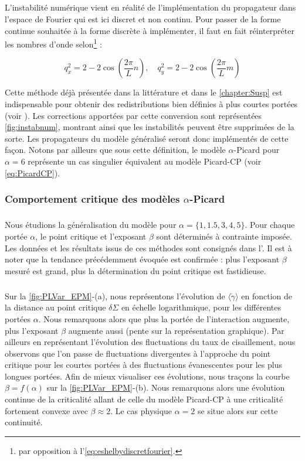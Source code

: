 \subparagraph{}L'instabilité numérique vient en réalité de l'implémentation du propagateur dans l'espace de Fourier qui est ici discret et non continu. Pour passer de la forme continue souhaitée à la forme discrète à implémenter, il faut en fait réinterpréter les nombres d'onde selon\footnote{par opposition à l'\autoref{eq:eshelbydiscretfourier}.} :

\begin{equation}
	q_x^2 = 2-2\cos\left( \frac{2\pi}{L}n \right),\quad q_y^2 = 2-2\cos\left( \frac{2\pi}{L}m \right)
\end{equation}

\noindent Cette méthode déjà présentée dans la littérature \cite{ferrero_criticality_2019, rossi_finite-disorder_2022} et dans le \autoref{chapter:Susp} est indispensable pour obtenir des redistributions bien définies à plus courtes portées (voir ). Les corrections apportées par cette conversion sont représentées \autoref{fig:instabnum}, montrant ainsi que les instabilités peuvent être supprimées de la sorte. Les propagateurs du modèle généralisé seront donc implémentés de cette façon. Notons par ailleurs que sous cette définition, le modèle $\alpha$-Picard pour $\alpha = 6$ représente un cas singulier équivalent au modèle Picard-CP (voir \autoref{eq:PicardCP}).

\subsubsection{Comportement critique des modèles $\alpha$-Picard}

\label{sec:criticalitealphapicard}

\subparagraph{}Nous étudions la généralisation du modèle pour $\alpha = \{1, 1.5, 3, 4, 5\}$. Pour chaque portée $\alpha$, le point critique et l'exposant $\beta$ sont déterminés à contrainte imposée. Les données et les résultats issus de ces méthodes sont consignés dans l'. Il est à noter que la tendance précédemment évoquée est confirmée : plus l'exposant $\beta$ mesuré est grand, plus la détermination du point critique est fastidieuse.

\subparagraph{}Sur la \autoref{fig:PLVar_EPM}-(a), nous représentons l'évolution de $\langle \dot{\gamma} \rangle$ en fonction de la distance au point critique $\delta\Sigma$ en échelle logarithmique, pour les différentes portées $\alpha$. Nous remarquons alors que plus la portée de l'interaction augmente, plus l'exposant $\beta$ augmente aussi (pente sur la représentation graphique). Par ailleurs en représentant l'évolution des fluctuations du taux de cisaillement, nous observons que l'on passe de fluctuations divergentes à l'approche du point critique pour les courtes portées à des fluctuations évanescentes pour les plus longues portées. Afin de mieux visualiser ces évolutions, nous traçons la courbe $\beta = f(\alpha)$ sur la \autoref{fig:PLVar_EPM}-(b). Nous remarquons alors une évolution continue de la criticalité allant de celle du modèle Picard-CP à une criticalité fortement convexe avec $\beta\approx 2$. Le cas physique $\alpha=2$ se situe alors sur cette continuité.

